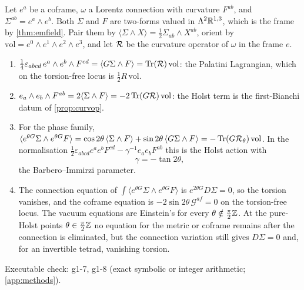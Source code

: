 Let $e^a$ be a coframe, $\omega$ a Lorentz connection with curvature $F^{ab}$, and $\Sigma^{ab}=e^a\wedge e^b$. Both $\Sigma$ and $F$ are two-forms valued in
$\Lambda^2\mathbb{R}^{1,3}$, which is the frame by \cref{thm:emfield}. Pair them by $\langle\Sigma\wedge X\rangle=\tfrac12\Sigma_{ab}\wedge X^{ab}$, orient by
$\mathrm{vol}=e^0\wedge e^1\wedge e^2\wedge e^3$, and let $\mathcal R$ be the curvature operator of $\omega$ in the frame $e$.

\begin{proposition}
\label{prop:holst}
\begin{enumerate}[label=(\roman*),leftmargin=2.2em]
\item $\tfrac14\varepsilon_{abcd}\,e^a\wedge e^b\wedge F^{cd}=\langle G\Sigma\wedge F\rangle=\operatorname{Tr}(\mathcal R)\,\mathrm{vol}$: the Palatini Lagrangian, which on the torsion-free
locus is $\tfrac12R\,\mathrm{vol}$.
\item $e_a\wedge e_b\wedge F^{ab}=2\langle\Sigma\wedge F\rangle=-2\operatorname{Tr}(G\mathcal R)\,\mathrm{vol}$: the Holst term is the first-Bianchi datum of \cref{prop:curvop}.
\item For the phase family, $\langle e^{\theta G}\Sigma\wedge e^{\theta G}F\rangle=\cos2\theta\,\langle\Sigma\wedge F\rangle+\sin2\theta\,\langle G\Sigma\wedge F\rangle=-\operatorname{Tr}(G\mathcal R_\theta)\,\mathrm{vol}$.
In the normalisation $\tfrac12\varepsilon_{abcd}e^ae^bF^{cd}-\gamma^{-1}e_ae_bF^{ab}$ this is the Holst action \cite{Holst96} with
\[
\gamma=-\tan2\theta ,
\]
the Barbero--Immirzi parameter.
\item The connection equation of $\int\langle e^{\theta G}\Sigma\wedge e^{\theta G}F\rangle$ is $e^{2\theta G}D\Sigma=0$, so the torsion vanishes, and the coframe equation is
$-2\sin2\theta\,\mathcal G^{af}=0$ on the torsion-free locus. The vacuum equations are Einstein's for every $\theta\notin\tfrac\pi2\mathbb{Z}$. At the pure-Holst points
$\theta\in\tfrac\pi2\mathbb{Z}$ no equation for the metric or coframe remains after the connection is eliminated, but the connection variation still gives $D\Sigma=0$
and, for an invertible tetrad, vanishing torsion.
\end{enumerate}
\end{proposition}

\noindent Executable check: g1-7, g1-8 (exact symbolic or integer arithmetic; \cref{app:methods}).

